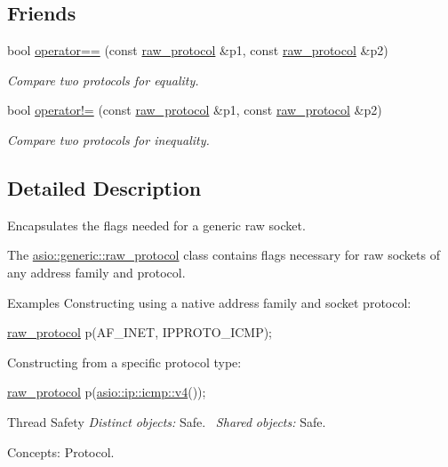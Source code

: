 \subsection*{Friends}
\begin{DoxyCompactItemize}
\item 
bool \hyperlink{classasio_1_1generic_1_1raw__protocol_a31d370120e02e4ad3b88951b55673066}{operator==} (const \hyperlink{classasio_1_1generic_1_1raw__protocol}{raw\+\_\+protocol} \&p1, const \hyperlink{classasio_1_1generic_1_1raw__protocol}{raw\+\_\+protocol} \&p2)
\begin{DoxyCompactList}\small\item\em Compare two protocols for equality. \end{DoxyCompactList}\item 
bool \hyperlink{classasio_1_1generic_1_1raw__protocol_a7cad117af85c82d42e5731c19bf1a336}{operator!=} (const \hyperlink{classasio_1_1generic_1_1raw__protocol}{raw\+\_\+protocol} \&p1, const \hyperlink{classasio_1_1generic_1_1raw__protocol}{raw\+\_\+protocol} \&p2)
\begin{DoxyCompactList}\small\item\em Compare two protocols for inequality. \end{DoxyCompactList}\end{DoxyCompactItemize}


\subsection{Detailed Description}
Encapsulates the flags needed for a generic raw socket. 

The \hyperlink{classasio_1_1generic_1_1raw__protocol}{asio\+::generic\+::raw\+\_\+protocol} class contains flags necessary for raw sockets of any address family and protocol.

\begin{DoxyParagraph}{Examples}
Constructing using a native address family and socket protocol\+: 
\begin{DoxyCode}
\hyperlink{classasio_1_1generic_1_1raw__protocol_ac579d774e2ae8a6bb023182498d9b916}{raw\_protocol} p(AF\_INET, IPPROTO\_ICMP); 
\end{DoxyCode}
 Constructing from a specific protocol type\+: 
\begin{DoxyCode}
\hyperlink{classasio_1_1generic_1_1raw__protocol_ac579d774e2ae8a6bb023182498d9b916}{raw\_protocol} p(\hyperlink{classasio_1_1ip_1_1icmp_a7545d246fedc3b70c3b42c95840d40eb}{asio::ip::icmp::v4}()); 
\end{DoxyCode}

\end{DoxyParagraph}
\begin{DoxyParagraph}{Thread Safety}
{\itshape Distinct} {\itshape objects\+:} Safe.~\newline
{\itshape Shared} {\itshape objects\+:} Safe.
\end{DoxyParagraph}
\begin{DoxyParagraph}{Concepts\+:}
Protocol. 
\end{DoxyParagraph}


